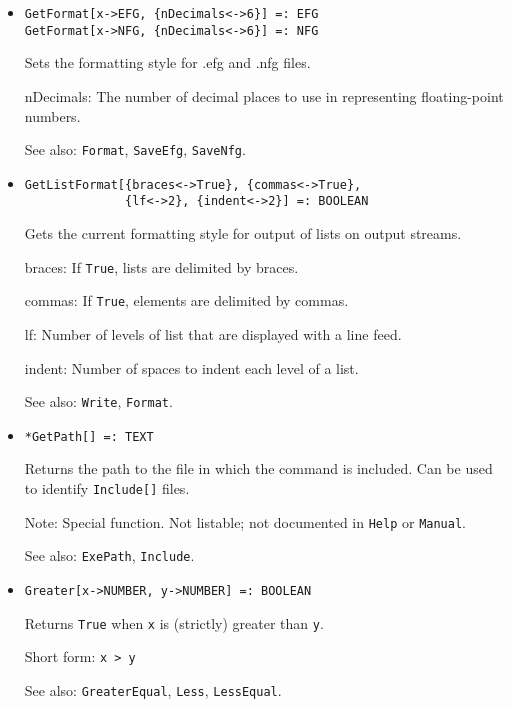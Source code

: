 \begin{itemize}
\item{}
\protect \large \begin{verbatim}
GetFormat[x->EFG, {nDecimals<->6}] =: EFG
GetFormat[x->NFG, {nDecimals<->6}] =: NFG
\end{verbatim} \normalsize

\bd
Sets the formatting style for .efg and .nfg files.
\bd
\item [nDecimals:] The number of decimal places to use in representing
floating-point numbers.
\ed
\item [See also:] \verb+Format+, \verb+SaveEfg+, \verb+SaveNfg+.
\ed

\item{}
\protect \large \begin{verbatim}
GetListFormat[{braces<->True}, {commas<->True},
              {lf<->2}, {indent<->2}] =: BOOLEAN 
\end{verbatim} \normalsize

\bd
Gets the current formatting style for output of lists on output streams.
\bd
\item [braces:] If \verb+True+, lists are delimited by braces.
\item [commas:] If \verb+True+, elements are delimited by commas.
\item [lf:] Number of levels of list that are displayed with a line feed.
\item [indent:] Number of spaces to indent each level of a list.
\ed
\item [See also:] \verb+Write+, \verb+Format+.
\ed

\item{}
\protect \large \begin{verbatim}
*GetPath[] =: TEXT 
\end{verbatim} \normalsize

\bd
Returns the path to the file in which the command is included.  Can be
used to identify \verb+Include[]+ files. 
\item [Note:] Special function.  Not listable; not documented in
\verb+Help+ or \verb+Manual+.
\item [See also:] \verb+ExePath+, \verb+Include+.
\ed

\item{}
\protect \large \begin{verbatim}
Greater[x->NUMBER, y->NUMBER] =: BOOLEAN 
\end{verbatim}\normalsize

\bd
Returns \verb+True+ when \verb+x+ is (strictly) greater than \verb+y+.
\item
[Short form:] \verb+x > y+
\item
[See also:] \verb+GreaterEqual+, \verb+Less+, \verb+LessEqual+.
\ed


\end{itemize}
